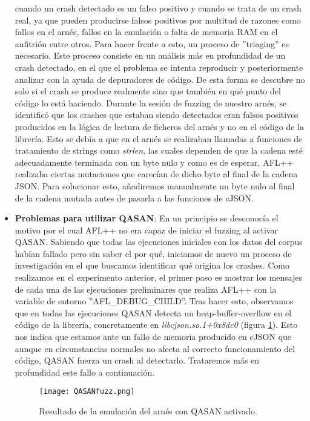 \begin{itemize}
    cuando un crash detectado es un falso positivo y cuando se trata de un crash real, ya que pueden producirse falsos positivos por
    multitud de razones como fallos en el arnés, fallos en la emulación o falta de memoria RAM en el anfitrión entre otros. Para hacer frente a esto, 
    un proceso de ''triaging'' es necesario. Este proceso consiste en un análisis más en profundidad de un crash detectado, en el que 
    el problema se intenta reproducir y posteriormente analizar con la ayuda de depuradores de código. De esta forma se descubre no solo 
    si el crash se produce realmente sino que también en qué punto del código lo está haciendo. Durante la sesión de fuzzing de nuestro 
    arnés, se identificó que los crashes que estaban siendo detectados eran falsos positivos producidos en la lógica de lectura de 
    ficheros del arnés y no en el código de la librería. Esto se debía a que en el arnés se realizaban llamadas a funciones de 
    tratamiento de strings como \textit{strlen}, las cuales dependen de que la cadena esté adecuadamente terminada con un byte nulo y 
    como es de esperar, AFL++ realizaba ciertas mutaciones que carecían de dicho byte al final de la cadena JSON. Para solucionar esto,
    añadiremos manualmente un byte nulo al final de la cadena mutada antes de pasarla a las funciones de cJSON. 
    \item \textbf{Problemas para utilizar QASAN}: En un principio se desconocía el motivo por el cual AFL++ no era capaz de iniciar el 
    fuzzing al activar QASAN. Sabiendo que todas las ejecuciones iniciales con los datos del corpus habían fallado pero sin saber el 
    por qué, iniciamos de nuevo un proceso de investigación en el que buscamos identificar qué origina los crashes. Como realizamos en el experimento anterior, el primer paso es mostrar 
    los mensajes de cada una de las ejecuciones preliminares que realiza AFL++ con la variable de entorno ''AFL\_DEBUG\_CHILD''. Tras hacer esto,
    observamos que en todas las ejecuciones QASAN detecta un heap-buffer-overflow en el código de la librería, concretamente en \textit{libcjson.so.1+0x8dc0}
    (figura \ref{fig:QASANfuzz}). Esto nos indica que estamos ante un fallo de memoria producido en cJSON que aunque en circunstancias normales
    no afecta al correcto funcionamiento del código, QASAN fuerza un crash al detectarlo. Trataremos más en profundidad este fallo a continuación.
    \begin{figure}[H]
        \centering
        \texttt{[image: QASANfuzz.png]}
        \caption{Resultado de la emulación del arnés con QASAN activado.}
        \label{fig:QASANfuzz}
    \end{figure}
\end{itemize}
